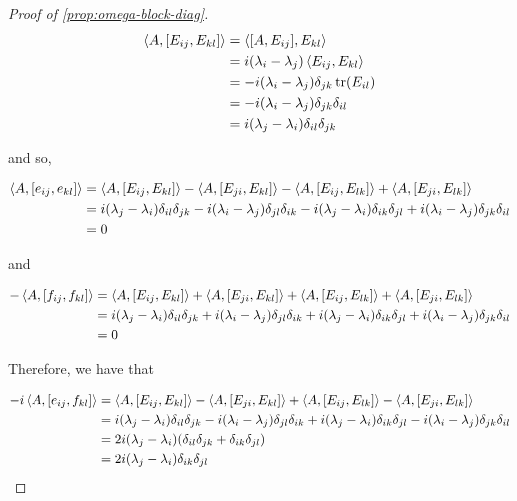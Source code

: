 \documentclass{report}
\begin{document}
\begin{proof}
    [Proof of \cref{prop:omega-block-diag}]
    \begin{align*}
\left\langle A, [E_{ij}, E_{kl}] \right\rangle &= \left\langle [A, E_{ij}], E_{kl} \right\rangle \\
&= i(\lambda_i - \lambda_j)\left\langle E_{ij}, E_{kl} \right\rangle \\
    &= -i(\lambda_i - \lambda_j)\delta_{jk}\tr(E_{il}) \\
    &= -i(\lambda_i - \lambda_j)\delta_{jk}\delta_{il} \\
    &= i(\lambda_j - \lambda_i)\delta_{il}\delta_{jk}
\end{align*}

and so,

\begin{align*}
    \left\langle A, [e_{ij}, e_{kl}] \right\rangle &= \left\langle A, [E_{ij}, E_{kl}] \right\rangle - \left\langle A, [E_{ji}, E_{kl}] \right\rangle - \left\langle A, [E_{ij}, E_{lk}] \right\rangle + \left\langle A, [E_{ji}, E_{lk}] \right\rangle \\
    &= i(\lambda_j - \lambda_i)\delta_{il}\delta_{jk} - i(\lambda_i - \lambda_j)\delta_{jl}\delta_{ik} - i(\lambda_j - \lambda_i)\delta_{ik}\delta_{jl} + i(\lambda_i - \lambda_j)\delta_{jk}\delta_{il} \\
    &= 0
\end{align*}

and

\begin{align*}
    -\left\langle A, [f_{ij}, f_{kl}] \right\rangle &= \left\langle A, [E_{ij}, E_{kl}] \right\rangle + \left\langle A, [E_{ji}, E_{kl}] \right\rangle + \left\langle A, [E_{ij}, E_{lk}] \right\rangle + \left\langle A, [E_{ji}, E_{lk}] \right\rangle \\
    &= i(\lambda_j - \lambda_i)\delta_{il}\delta_{jk} + i(\lambda_i - \lambda_j)\delta_{jl}\delta_{ik} + i(\lambda_j - \lambda_i)\delta_{ik}\delta_{jl} + i(\lambda_i - \lambda_j)\delta_{jk}\delta_{il} \\
    &= 0
\end{align*}

Therefore, we have that

\begin{align*}
    -i\left\langle A, [e_{ij}, f_{kl}] \right\rangle &= \left\langle A, [E_{ij}, E_{kl}] \right\rangle - \left\langle A, [E_{ji}, E_{kl}] \right\rangle + \left\langle A, [E_{ij}, E_{lk}] \right\rangle - \left\langle A, [E_{ji}, E_{lk}] \right\rangle \\
    &= i(\lambda_j - \lambda_i)\delta_{il}\delta_{jk} - i(\lambda_i - \lambda_j)\delta_{jl}\delta_{ik} + i(\lambda_j - \lambda_i)\delta_{ik}\delta_{jl} - i(\lambda_i - \lambda_j)\delta_{jk}\delta_{il} \\
    &= 2i(\lambda_j - \lambda_i)(\delta_{il}\delta_{jk} + \delta_{ik}\delta_{jl}) \\
    &= 2i(\lambda_j - \lambda_i)\delta_{ik}\delta_{jl}
\end{align*}


\end{proof}
\end{document}
